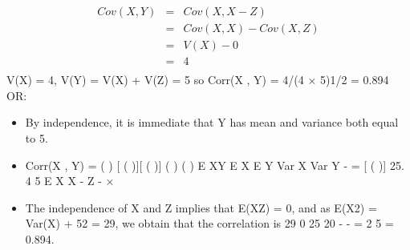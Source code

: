 \documentclass[a4paper,12pt]{article}
\begin{document}
\begin{eqnarray*}
Cov(X , Y) &=& Cov(X , X - Z) \\ &=& Cov(X , X) - Cov(X , Z) \\ &=& V(X) - 0 \\&=& 4\\
\end{eqnarray*}
V(X) = 4, V(Y) = V(X) + V(Z) = 5
so Corr(X , Y) = 4/(4 × 5)1/2 = 0.894
OR:
\begin{itemize}
    \item By independence, it is immediate that Y has mean and variance both equal
to 5.
\item Corr(X , Y) =
( ) [ ( )][ ( )]
( ) ( )
E XY E X E Y
Var X Var Y
- =
[ ( )] 25.
4 5
E X X - Z -
×
\item The independence of X and Z implies that E(XZ) = 0, and as E(X2) = Var(X) + 52 = 29, we obtain that the correlation is
29 0 25
20
- - =
2
5
= 0.894.
\end{itemize}
\end{document}
